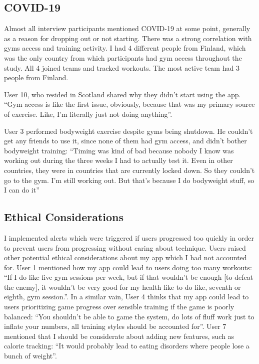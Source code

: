 \documentclass{l4proj}
\begin{document}
\subsection{COVID-19}
Almost all interview participants mentioned COVID-19 at some point, generally as a reason for dropping out or not starting. There was a strong correlation with gyms access and training activity. I had 4 different people from Finland, which was the only country from which participants had gym access throughout the study. All 4 joined teams and tracked workouts. The most active team had 3 people from Finland.

User 10, who resided in Scotland shared why they didn't start using the app. ``Gym access is like the first issue, obviously, because that was my primary source of exercise. Like, I'm literally just not doing anything''.

User 3 performed bodyweight exercise despite gyms being shutdown. He couldn't get any friends to use it, since none of them had gym access, and didn't bother bodyweight training: ``Timing was kind of bad because nobody I know was working out during the three weeks I had to actually test it. Even in other countries, they were in countries that are currently locked down. So they couldn't go to the gym. I'm still working out. But that's because I do bodyweight stuff, so I can do it''

\subsection{Ethical Considerations}
I implemented alerts which were triggered if users progressed too quickly in order to prevent users from progressing without caring about technique. Users raised other potential ethical considerations about my app which I had not accounted for. User 1 mentioned how my app could lead to users doing too many workouts: ``If I do like five gym sessions per week, but if that wouldn't be enough [to defeat the enemy], it wouldn't be very good for my health like to do like, seventh or eighth, gym session.''. In a similar vain, User 4 thinks that my app could lead to users prioritizing game progress over sensible training if the game is poorly balanced: ``You shouldn't be able to game the system, do lots of fluff work just to inflate your numbers, all training styles should be accounted for''. User 7 mentioned that I should be considerate about adding new features, such as calorie tracking: ``It would probably lead to eating disorders where people lose a bunch of weight''.
\end{document}

